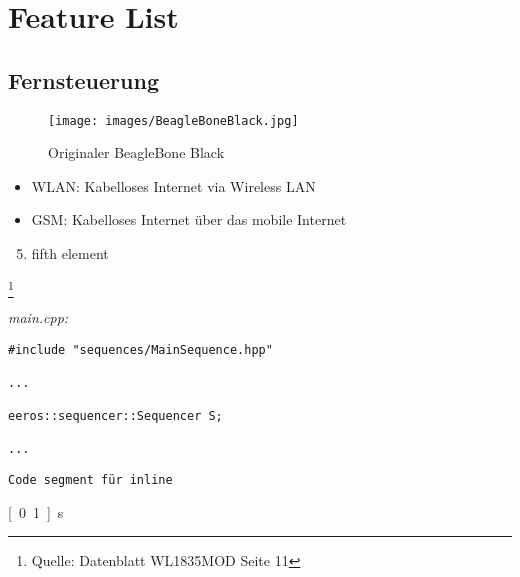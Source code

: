 


\chapter{Feature List}
\section{Fernsteuerung}


\begin{figure}[!ht]
\centering
\texttt{[image: images/BeagleBoneBlack.jpg]}
\caption{Originaler BeagleBone Black}
\label{fig:BeagleBoneBlack}
\end{figure}


\begin{itemize}
\item WLAN: Kabelloses Internet via Wireless LAN
\item GSM: Kabelloses Internet über das mobile Internet
\end{itemize}


\begin{enumerate}
  \setcounter{enumi}{4}
  \item fifth element
\end{enumerate}

\footnote{Quelle: Datenblatt WL1835MOD Seite 11}

\-\hspace{2cm}

\textit{main.cpp:}\
\begin{lstlisting}
#include "sequences/MainSequence.hpp"

...

eeros::sequencer::Sequencer S;

...
\end{lstlisting}


\texttt{Code segment für inline} 


\usepackage{units}
\unit[0.1]{s}



\usepackage{pifont}
\newcommand{\cmark}{}%
\newcommand{\xmark}{}%
\cmark
\xmark

